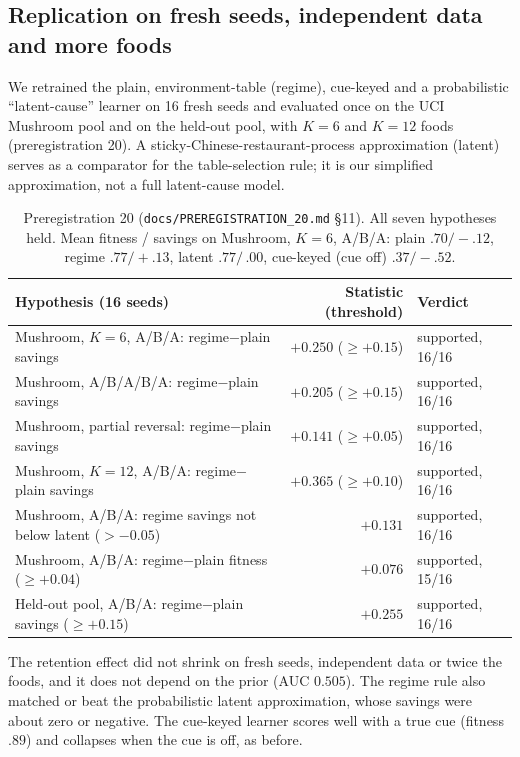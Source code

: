 \documentclass[11pt]{article}
\begin{document}
\subsection{Replication on fresh seeds, independent data and more foods}
We retrained the plain, environment-table (regime), cue-keyed and a probabilistic ``latent-cause'' learner on 16 fresh seeds and evaluated once on the UCI Mushroom pool and on the held-out pool, with $K=6$ and $K=12$ foods (preregistration 20). A sticky-Chinese-restaurant-process approximation (latent) serves as a comparator for the table-selection rule; it is our simplified approximation, not a full latent-cause model.
\begin{table}[h]\centering\small
\begin{tabular}{@{}p{7.0cm}rl@{}}\toprule
Hypothesis (16 seeds) & Statistic (threshold) & Verdict\\\midrule
Mushroom, $K{=}6$, A/B/A: regime$-$plain savings & $+0.250$ ($\ge+0.15$) & supported, 16/16\\
Mushroom, A/B/A/B/A: regime$-$plain savings & $+0.205$ ($\ge+0.15$) & supported, 16/16\\
Mushroom, partial reversal: regime$-$plain savings & $+0.141$ ($\ge+0.05$) & supported, 16/16\\
Mushroom, $K{=}12$, A/B/A: regime$-$plain savings & $+0.365$ ($\ge+0.10$) & supported, 16/16\\
Mushroom, A/B/A: regime savings not below latent ($>-0.05$) & $+0.131$ & supported, 16/16\\
Mushroom, A/B/A: regime$-$plain fitness ($\ge+0.04$) & $+0.076$ & supported, 15/16\\
Held-out pool, A/B/A: regime$-$plain savings ($\ge+0.15$) & $+0.255$ & supported, 16/16\\\bottomrule
\end{tabular}
\caption{\label{tab:replication}Preregistration 20 (\texttt{docs/PREREGISTRATION\_20.md} \S11). All seven hypotheses held. Mean fitness / savings on Mushroom, $K{=}6$, A/B/A: plain $.70/-.12$, regime $.77/+.13$, latent $.77/\,.00$, cue-keyed (cue off) $.37/-.52$.}
\end{table}
The retention effect did not shrink on fresh seeds, independent data or twice the foods, and it does not depend on the prior (AUC $0.505$). The regime rule also matched or beat the probabilistic latent approximation, whose savings were about zero or negative. The cue-keyed learner scores well with a true cue (fitness $.89$) and collapses when the cue is off, as before.
\end{document}
